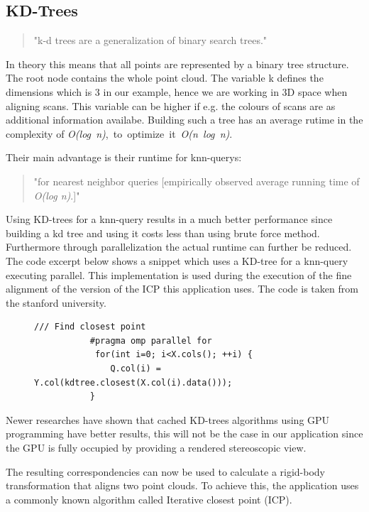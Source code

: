 \documentclass[hyperref,english,bachelorofscience,bibnum]{cgvpub}
\begin{document}
\subsection{KD-Trees}

\begin{quote}
"k-d trees are a generalization of binary search trees."\cite{Nuchter2007}
\end{quote}
In theory this means that all points are represented by a binary tree structure. The root node contains the whole point cloud. The variable k defines the dimensions which is 3 in our example, hence we are working in 3D space when aligning scans. This variable can be higher if e.g. the colours of scans are as additional information availabe.
Building such a tree has an average rutime in the complexity of \mbox{\textit{O(log n)}, to optimize it \textit{O(n log n)}\cite{bentley1975}}.

Their main advantage is their runtime for knn-querys: 
\begin{quote}
"for nearest neighbor queries [empirically observed average running time of \textit{O(log n)}.]" \cite{bentley1975}
\end{quote}
Using KD-trees for a knn-query results in a much better performance since building a kd tree and using it costs less than using brute force method. Furthermore through parallelization the actual runtime can further be reduced. The code excerpt below shows a snippet which uses a KD-tree for a knn-query executing parallel. This implementation is used during the execution of the fine alignment of the version of the ICP this application uses. The code is taken from the stanford university.

\begin{figure}[htbp]
\begin{lstlisting}[frame=trbl]
           /// Find closest point
           #pragma omp parallel for
            for(int i=0; i<X.cols(); ++i) {
               Q.col(i) = Y.col(kdtree.closest(X.col(i).data()));
           }
\end{lstlisting}
\end{figure}

Newer researches have shown that cached KD-trees algorithms using GPU programming have better results\cite{Garcia2008}, this will not be the case in our application since the GPU is fully occupied by providing a rendered stereoscopic view.

The resulting correspondencies can now be used to calculate a rigid-body transformation that aligns two point clouds. To achieve this, the application uses a commonly known algorithm called Iterative closest point (ICP).
\end{document}

